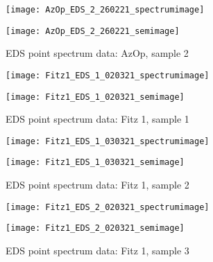 \begin{figure}[H]
\centering
\begin{minipage}{.45\textwidth}
  \centering
  \texttt{[image: AzOp\_EDS\_2\_260221\_spectrumimage]}
\end{minipage}
\begin{minipage}{.45\textwidth}
  \centering
  \texttt{[image: AzOp\_EDS\_2\_260221\_semimage]}
\end{minipage}
\caption[EDS point spectrum data: AzOp, sample 2]{EDS point spectrum data: AzOp, sample 2}
\label{fig:azop_point_eds_2}
\end{figure}



\begin{figure}[H]
\centering
\begin{minipage}{.45\textwidth}
  \centering
  \texttt{[image: Fitz1\_EDS\_1\_020321\_spectrumimage]}
\end{minipage}
\begin{minipage}{.45\textwidth}
  \centering
  \texttt{[image: Fitz1\_EDS\_1\_020321\_semimage]}
\end{minipage}
\caption[EDS point spectrum data: Fitz 1, sample 1]{EDS point spectrum data: Fitz 1, sample 1}
\label{fig:fitz1_point_eds_1}
\end{figure}

\begin{figure}[H]
\centering
\begin{minipage}{.45\textwidth}
  \centering
  \texttt{[image: Fitz1\_EDS\_1\_030321\_spectrumimage]}
\end{minipage}
\begin{minipage}{.45\textwidth}
  \centering
  \texttt{[image: Fitz1\_EDS\_1\_030321\_semimage]}
\end{minipage}
\caption[EDS point spectrum data: Fitz 1, sample 2]{EDS point spectrum data: Fitz 1, sample 2}
\label{fig:fitz1_point_eds_2}
\end{figure}

\begin{figure}[H]
\centering
\begin{minipage}{.45\textwidth}
  \centering
  \texttt{[image: Fitz1\_EDS\_2\_020321\_spectrumimage]}
\end{minipage}
\begin{minipage}{.45\textwidth}
  \centering
  \texttt{[image: Fitz1\_EDS\_2\_020321\_semimage]}
\end{minipage}
\caption[EDS point spectrum data: Fitz 1, sample 3]{EDS point spectrum data: Fitz 1, sample 3}
\label{fig:fitz1_point_eds_3}
\end{figure}

